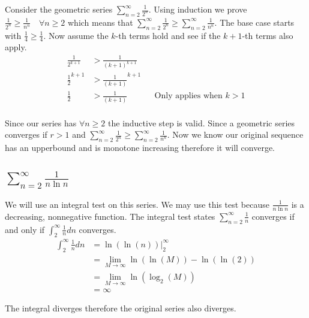 \documentclass{article}
\begin{document}
Consider the geometric series $\sum^\infty_{n=2} \frac{1}{2^n}$. Using
induction we prove $\frac{1}{2^n} \geq \frac{1}{n^n} \quad \forall n \geq 2$
which means that
$\sum^\infty_{n=2} \frac{1}{2^n} \geq \sum^\infty_{n=2} \frac{1}{n^n}$.
The base case starts with $\frac{1}{4} \geq \frac{1}{4}$. Now assume the
$k$-th terms hold and see if the $k+1$-th terms also apply.
\begin{align*}
    \frac{1}{2^{k+1}} &> \frac{1}{(k+1)^{k+1}} \\
    \frac{1}{2}^{k+1} &> \frac{1}{(k+1)}^{k+1} \\
    \frac{1}{2} &> \frac{1}{(k+1)} && \text{Only applies when $k>1$} \\
\end{align*}

Since our series has $\forall n \geq 2$ the inductive step is valid. Since a
geometric series converges if $r > 1$ and
$\sum^\infty_{n=2} \frac{1}{2^n} \geq \sum^\infty_{n=2} \frac{1}{n^n}$.
Now we know our original sequence has an upperbound and is monotone increasing
therefore it will converge.

\subsection{$\sum^\infty_{n=2} \frac{1}{n\ln n}$}
We will use an integral test on this series. We may use this test because
$\frac{1}{n\ln n}$ is a decreasing, nonnegative function. The integral test
states $\sum^\infty_{n=2} \frac{1}{n}$ converges if and only if
$\int^\infty_{2} \frac{1}{n} dn$ converges.
\begin{align*}
    \int^\infty_{2} \frac{1}{n} dn &= \ln(\ln(n))|^\infty_2 \\
    &= \lim_{M \to \infty} \ln(\ln(M)) - \ln(\ln(2)) \\
    &= \lim_{M \to \infty} \ln(\log_2(M)) \\
    &= \infty
\end{align*}

The integral diverges therefore the original series also diverges.
\end{document}
